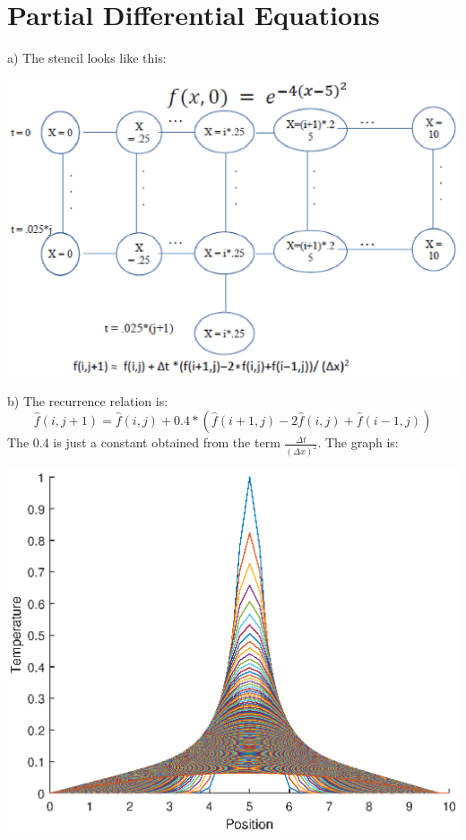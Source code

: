 \documentclass{article}
\begin{document}
\section{Partial Differential Equations}
\par
a) The stencil looks like this:
\begin{center}
    \includegraphics[scale = 0.8]{stencil.eps}
\end{center}
b) The recurrence relation is: \[\hat{f}(i,j+1)=\hat{f}(i,j)+0.4*(\hat{f}(i+1,j)-2\hat{f}(i,j)+\hat{f}(i-1,j))\] The 0.4 is just a constant obtained from the term $\frac{\Delta t}{(\Delta x)^2}$.
The graph is:
\begin{center}
    \includegraphics[scale = 0.8]{firsttimestep.eps}
\end{center}
\end{document}

